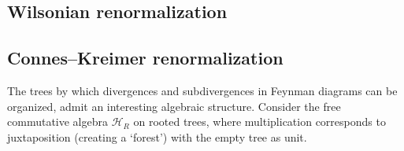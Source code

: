 \subsection{Wilsonian renormalization}


 \subsection{Connes--Kreimer renormalization}

    The trees by which divergences and subdivergences in Feynman diagrams can be organized, admit an interesting algebraic structure. Consider the free commutative algebra $\mathcal{H}_R$ on rooted trees, where multiplication corresponds to juxtaposition (creating a `forest') with the empty tree as unit.

